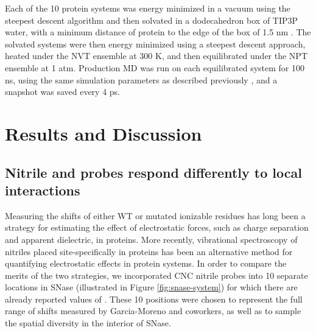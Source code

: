 Each of the 10 protein systems was energy minimized in a vacuum using the steepest descent algorithm and then solvated in a dodecahedron box of TIP3P water, with a minimum distance of protein to the edge of the box of 1.5 nm \cite{Jorgenson1983}. 
The solvated systems were then energy minimized using a steepest descent approach, heated under the NVT ensemble at 300 K, and then equilibrated under the NPT ensemble at 1 atm. 
Production MD was run on each equilibrated system for 100 ns, using the same simulation parameters as described previously \cite{First2018}, and a snapshot was saved every 4 ps.

\section{Results and Discussion} \label{snase-results}

\subsection{Nitrile and \pKa{} probes respond differently to local interactions}

Measuring the \pKa{} shifts of either WT or mutated ionizable residues has long been a strategy for estimating the effect of electrostatic forces, such as charge separation and apparent dielectric, in proteins. 
More recently, vibrational spectroscopy of nitriles placed site-specifically in proteins has been an alternative method for quantifying electrostatic effects in protein systems. 
In order to compare the merits of the two strategies, we incorporated CNC nitrile probes into 10 separate locations in SNase (illustrated in Figure \ref{fig:snase-system}) for which there are already reported values of \dpKa{} \cite{Isom2010, Isom2011}. 
These 10 positions were chosen to represent the full range of \pKa{} shifts measured by Garcia-Moreno and coworkers, as well as to sample the spatial diversity in the interior of SNase.

